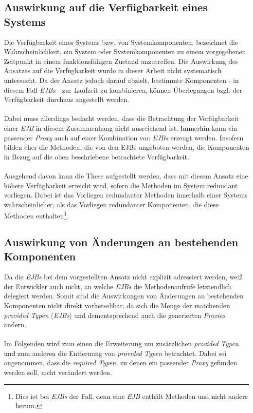 \subsection{Auswirkung auf die Verfügbarkeit eines Systems}\label{sec_stabliliy}
Die Verfügbarkeit eines Systems bzw. von Systemkomponenten, bezeichnet die Wahrscheinlichkeit, ein System oder Systemkomponenten zu einem vorgegebenen Zeitpunkt in einem funktionsfähigen Zustand anzutreffen. \cite{it-admin}
Die Auswirkung des Ansatzes auf die Verfügbarkeit wurde in dieser Arbeit nicht systematisch untersucht. Da der Ansatz jedoch darauf abzielt, bestimmte Komponenten - in diesem Fall \emph{EJBs} - zur Laufzeit zu kombinieren, können Überlegungen bzgl. der Verfügbarkeit durchaus angestellt werden.
\\\\
Dabei muss allerdings bedacht werden, dass die Betrachtung der Verfügbarkeit einer \emph{EJB} in diesem Zusammenhang nicht ausreichend ist. Immerhin kann ein passender \emph{Proxy} auch auf einer Kombination von \emph{EJBs} erzeugt werden. Insofern bilden eher die Methoden, die von den EJBs angeboten werden, die Komponenten in Bezug auf die oben beschriebene betrachtete Verfügbarkeit.
\\\\
Ausgehend davon kann die These aufgestellt werden, dass mit diesem Ansatz eine höhere Verfügbarkeit erreicht wird, sofern die Methoden im System redundant vorliegen. Dabei ist das Vorliegen redundanter Methoden innerhalb einer Systems wahrscheinlicher, als das Vorliegen redundanter Komponenten, die diese Methoden enthalten\footnote{Dies ist bei \emph{EJBs} der Fall, denn eine \emph{EJB} enthält Methoden und nicht anders herum.}. 

\subsection{Auswirkung von Änderungen an bestehenden Komponenten}
Da die \emph{EJBs} bei dem vorgestellten Ansatz nicht explizit adressiert werden, weiß der Entwickler auch nicht, an welche \emph{EJBs} die Methodenaufrufe letztendlich delegiert werden. Somit sind die Auswirkungen von Änderungen an bestehenden Komponenten nicht direkt vorhersehbar, da sich die Menge der matchenden \emph{provided Typen} (\emph{EJBs}) und dementsprechend auch die generierten \emph{Proxies} ändern.
\\\\
Im Folgenden wird zum einen die Erweiterung um zusätzlichen \emph{provided Typen} und zum anderen die Entfernung von \emph{provided Typen} betrachtet. Dabei sei angenommen, dass die \emph{required Typen}, zu denen ein passender \emph{Proxy} gefunden werden soll, nicht verändert werden.
